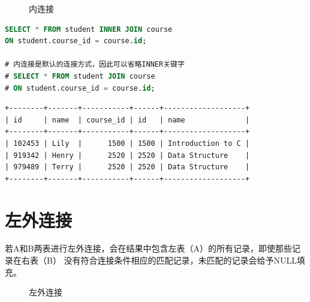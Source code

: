 \documentclass[12pt, openany, oneside]{book}
\begin{document}
\begin{figure}[H]
    \centering
    \caption{内连接}
\end{figure}


\begin{lstlisting}[language=SQL]
SELECT * FROM student INNER JOIN course
ON student.course_id = course.id;

# 内连接是默认的连接方式，因此可以省略INNER关键字
# SELECT * FROM student JOIN course
# ON student.course_id = course.id;
\end{lstlisting}

\begin{tcolorbox}
    \begin{verbatim}
+--------+-------+-----------+------+-------------------+
| id     | name  | course_id | id   | name              |
+--------+-------+-----------+------+-------------------+
| 102453 | Lily  |      1500 | 1500 | Introduction to C |
| 919342 | Henry |      2520 | 2520 | Data Structure    |
| 979489 | Terry |      2520 | 2520 | Data Structure    |
+--------+-------+-----------+------+-------------------+
	\end{verbatim}
\end{tcolorbox}

\section{左外连接}

若A和B两表进行左外连接，会在结果中包含左表（A）的所有记录，即使那些记录在右表（B） 没有符合连接条件相应的匹配记录，未匹配的记录会给予NULL填充。 \\

\begin{figure}[H]
    \centering
    \caption{左外连接}
\end{figure}
\end{document}
